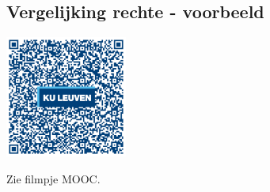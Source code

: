 %
%
%
%
%


\subsection{Vergelijking rechte - voorbeeld}
\begin{minipage}{.25\linewidth}
	\raggedright
	\includegraphics[width=4cm]{4_opp_inhoud_an_meetk/inputs/QR_Code_VGLRECHTE_module4new}
\end{minipage}
\begin{minipage}{.7\linewidth}
	Zie filmpje MOOC.
\end{minipage}


